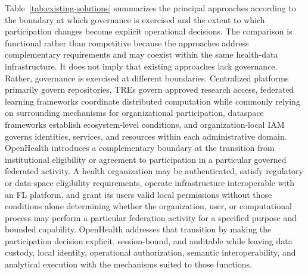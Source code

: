 \documentclass[twoside,11pt]{article}
\begin{document}
Table~\ref{tab:existing-solutions} summarizes the principal approaches according to the boundary at which governance is exercised and the extent to which participation changes become explicit operational decisions. The comparison is functional rather than competitive because the approaches address complementary requirements and may coexist within the same health-data infrastructure. It does not imply that existing approaches lack governance. Rather, governance is exercised at different boundaries. Centralized platforms primarily govern repositories, TREs
govern approved research access, federated learning frameworks coordinate distributed computation while commonly relying on surrounding mechanisms for organizational participation, dataspace frameworks establish ecosystem-level conditions, and organization-local IAM governs identities, services, and resources within each administrative domain. OpenHealth introduces a complementary boundary at the transition from institutional eligibility
or agreement to participation in a particular governed federated activity.
A health organization may   be authenticated, satisfy regulatory or data-space eligibility requirements, operate infrastructure interoperable with an FL platform, and grant
its users valid local permissions without those conditions alone determining whether the organization, user, or computational process may perform a particular federation activity
for a specified purpose and bounded capability. OpenHealth addresses that transition by making the participation decision explicit, session-bound, and auditable while leaving data custody, local identity, operational authorization, semantic interoperability, and analytical execution with the mechanisms suited to those functions.
\end{document}
